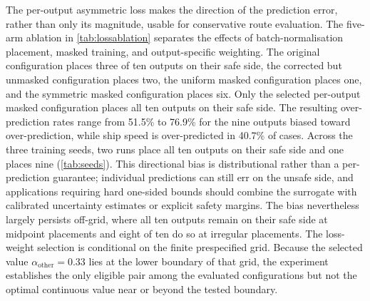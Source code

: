 \documentclass[final,5p,times,twocolumn,numbers]{elsarticle}
\begin{document}
The per-output asymmetric loss makes the direction of the prediction error, rather than only its magnitude, usable for conservative route evaluation. The five-arm ablation in \autoref{tab:lossablation} separates the effects of batch-normalisation placement, masked training, and output-specific weighting. The original configuration places three of ten outputs on their safe side, the corrected but unmasked configuration places two, the uniform masked configuration places one, and the symmetric masked configuration places six. Only the selected per-output masked configuration places all ten outputs on their safe side. The resulting over-prediction rates range from 51.5\% to 76.9\% for the nine outputs biased toward over-prediction, while ship speed is over-predicted in 40.7\% of cases. Across the three training seeds, two runs place all ten outputs on their safe side and one places nine (\autoref{tab:seeds}). This directional bias is distributional rather than a per-prediction guarantee; individual predictions can still err on the unsafe side, and applications requiring hard one-sided bounds should combine the surrogate with calibrated uncertainty estimates or explicit safety margins. The bias nevertheless largely persists off-grid, where all ten outputs remain on their safe side at midpoint placements and eight of ten do so at irregular placements. The loss-weight selection is conditional on the finite prespecified grid. Because the selected value $\alpha_{\mathrm{other}}=0.33$ lies at the lower boundary of that grid, the experiment establishes the only eligible pair among the evaluated configurations but not the optimal continuous value near or beyond the tested boundary.
\end{document}
